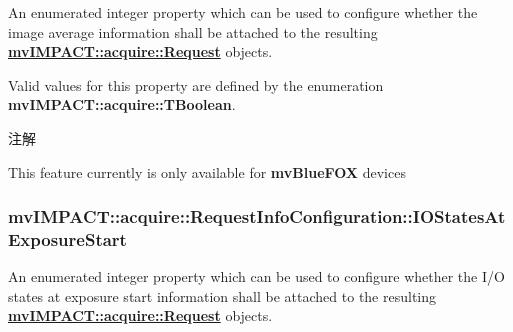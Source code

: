 An enumerated integer property which can be used to configure whether the image average information shall be attached to the resulting {\bfseries \hyperlink{classmv_i_m_p_a_c_t_1_1acquire_1_1_request}{mv\+I\+M\+P\+A\+C\+T\+::acquire\+::\+Request}} objects. 

Valid values for this property are defined by the enumeration {\bfseries mv\+I\+M\+P\+A\+C\+T\+::acquire\+::\+T\+Boolean}. \begin{DoxyNote}{注解}

\begin{DoxyItemize}
\item This feature currently is only available for {\bfseries mv\+Blue\+F\+O\+X} devices 
\end{DoxyItemize}
\end{DoxyNote}
\hypertarget{classmv_i_m_p_a_c_t_1_1acquire_1_1_request_info_configuration_aa4df04672e15722bd08592d3332851ed}{
\subsubsection[{I\+O\+States\+At\+Exposure\+Start}]{ mv\+I\+M\+P\+A\+C\+T\+::acquire\+::\+Request\+Info\+Configuration\+::\+I\+O\+States\+At\+Exposure\+Start}}\label{classmv_i_m_p_a_c_t_1_1acquire_1_1_request_info_configuration_aa4df04672e15722bd08592d3332851ed}


An enumerated integer property which can be used to configure whether the I/\+O states at exposure start information shall be attached to the resulting {\bfseries \hyperlink{classmv_i_m_p_a_c_t_1_1acquire_1_1_request}{mv\+I\+M\+P\+A\+C\+T\+::acquire\+::\+Request}} objects. 

